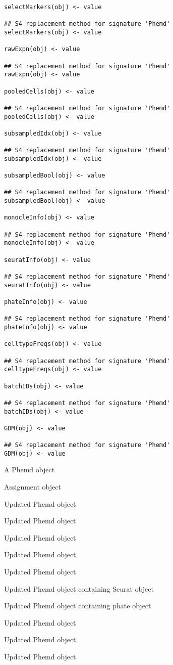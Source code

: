 \documentclass[a4paper]{book}
\begin{document}
%
\begin{Usage}
\begin{verbatim}
selectMarkers(obj) <- value

## S4 replacement method for signature 'Phemd'
selectMarkers(obj) <- value

rawExpn(obj) <- value

## S4 replacement method for signature 'Phemd'
rawExpn(obj) <- value

pooledCells(obj) <- value

## S4 replacement method for signature 'Phemd'
pooledCells(obj) <- value

subsampledIdx(obj) <- value

## S4 replacement method for signature 'Phemd'
subsampledIdx(obj) <- value

subsampledBool(obj) <- value

## S4 replacement method for signature 'Phemd'
subsampledBool(obj) <- value

monocleInfo(obj) <- value

## S4 replacement method for signature 'Phemd'
monocleInfo(obj) <- value

seuratInfo(obj) <- value

## S4 replacement method for signature 'Phemd'
seuratInfo(obj) <- value

phateInfo(obj) <- value

## S4 replacement method for signature 'Phemd'
phateInfo(obj) <- value

celltypeFreqs(obj) <- value

## S4 replacement method for signature 'Phemd'
celltypeFreqs(obj) <- value

batchIDs(obj) <- value

## S4 replacement method for signature 'Phemd'
batchIDs(obj) <- value

GDM(obj) <- value

## S4 replacement method for signature 'Phemd'
GDM(obj) <- value
\end{verbatim}
\end{Usage}
%
\begin{Arguments}
\begin{ldescription}
\item[\code{obj}] A Phemd object

\item[\code{value}] Assignment object
\end{ldescription}
\end{Arguments}
%
\begin{Value}
Updated Phemd object

Updated Phemd object

Updated Phemd object

Updated Phemd object

Updated Phemd object

Updated Phemd object containing Seurat object

Updated Phemd object containing phate object

Updated Phemd object

Updated Phemd object

Updated Phemd object
\end{Value}
\end{document}
